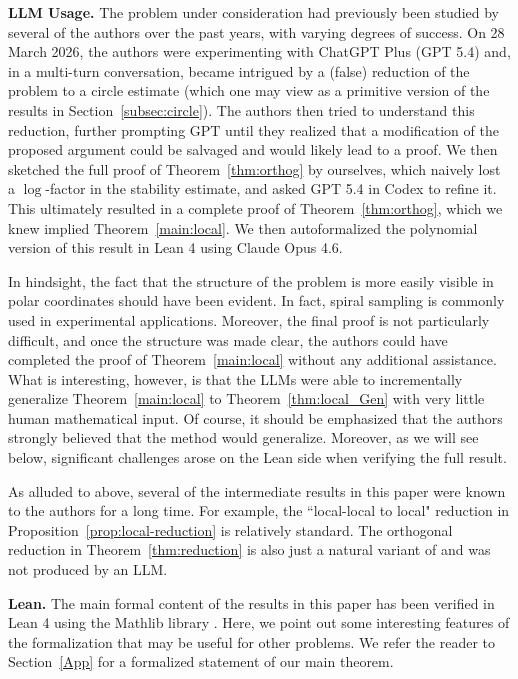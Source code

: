 \documentclass[11pt]{amsart}
\theoremstyle{remark}
\begin{document}
\textbf{LLM Usage.} The problem under consideration had previously been studied by several of the authors over the past years, with varying degrees of success. On 28 March 2026, the authors were experimenting with ChatGPT Plus (GPT 5.4) and, in a multi-turn conversation, became intrigued by a (false) reduction of the problem to a circle estimate (which one may view as a primitive version of the results in Section~\ref{subsec:circle}). The authors then tried to understand this reduction, further prompting GPT until they realized that a modification of the proposed argument could be salvaged and would likely lead to a proof. We then sketched the full proof of Theorem~\ref{thm:orthog} by ourselves, which naively lost a $\log$-factor in the stability estimate, and asked GPT 5.4 in Codex to refine it. This ultimately resulted in a complete proof of Theorem~\ref{thm:orthog}, which we knew implied Theorem~\ref{main:local}. We then autoformalized the polynomial version of this result in Lean 4 using Claude Opus 4.6. 
 \vspace{0.5em}


In hindsight, the fact that the structure of the problem is more easily visible in polar coordinates should have been evident. In fact, spiral sampling is commonly used in experimental applications. Moreover, the final proof is not particularly difficult, and once the structure was made clear, the authors could have completed the proof of  Theorem~\ref{main:local} without any additional assistance. What is interesting, however, is that the LLMs were able to incrementally generalize Theorem~\ref{main:local} to Theorem~\ref{thm:local_Gen} with very little human mathematical input. Of course, it should be emphasized that the authors strongly believed that the method would generalize. Moreover, as we will see below, significant challenges arose on the Lean side when verifying the full result.
 \vspace{0.5em}

As alluded to above, several of the intermediate results in this paper were known to the authors for a long time. For example, the ``local-local to local" reduction in Proposition~\ref{prop:local-reduction} is relatively standard. The orthogonal reduction in Theorem~\ref{thm:reduction}  is also just a natural variant of \cite[Theorem 3.10]{MR4800909} and was not produced by an LLM.
 \vspace{0.5em}

\textbf{Lean.} The main formal content of the results in this paper has been verified in Lean 4 \cite{lean4} using the Mathlib library \cite{mathlib2020}.  Here, we point out some interesting features of the formalization that may be useful for other problems. We refer the reader to Section~\ref{App} for a formalized statement of our main theorem.
 \vspace{0.5em}
\end{document}
